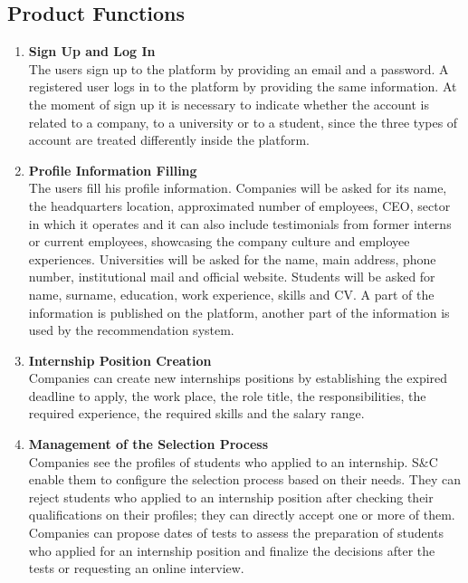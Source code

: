

\subsection{Product Functions}
    \begin{enumerate}
        \item \textbf {Sign Up and Log In}              %
        \\ The users sign up to the platform by providing an email and a password. A registered user logs in to the platform by providing the same information. At the moment of sign up it is necessary to indicate whether the account is related to a company, to a university or to a student, since the three types of account are treated differently inside the platform.
        \item \textbf {Profile Information Filling}     %
        \\ The users fill his profile information. Companies will be asked for its name, the headquarters location, approximated number of employees, CEO, sector in which it operates and it can also include testimonials from former interns or current employees, showcasing the company culture and employee experiences. Universities will be asked for the name, main address, phone number, institutional mail and official website. Students will be asked for name, surname, education, work experience, skills and CV. A part of the information is published on the platform, another part of the information is used by the recommendation system.
        \item \textbf {Internship Position Creation}
        \\ Companies can create new internships positions by establishing the expired deadline to apply, the work place, the role title, the responsibilities, the required experience, the required skills and the salary range.
        \item \textbf {Management of the Selection Process}
        \\ Companies see the profiles of students who applied to an internship. S\&C enable them to configure the selection process based on their needs. They can reject students who applied to an internship position after checking their qualifications on their profiles; they can directly accept one or more of them. Companies can propose dates of tests to assess the preparation of students who applied for an internship position and finalize the decisions after the tests or requesting an online interview.

\end{enumerate}
